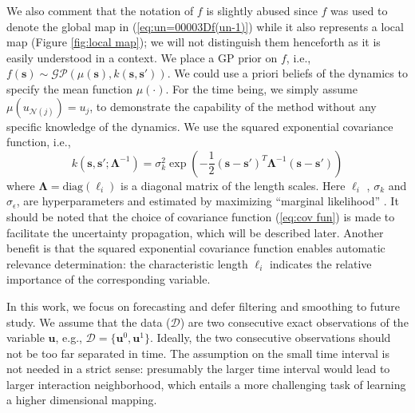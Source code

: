 \documentclass[smallextended,natbib]{svjour3}       %
\begin{document}
We also comment that the notation of $f$ is slightly abused since $f$ was used to denote the global map in (\ref{eq:un=00003Df(un-1)}) while it also represents a local map (Figure \ref{fig:local map}); we will not distinguish them henceforth as it is easily understood in a context. We place a GP prior on $f$, i.e., $f(\mathbf{s})\sim\mathcal{GP}(\mu(\mathbf{s}),k(\mathbf{s},\mathbf{s}'))$. We could use a priori beliefs of the dynamics to specify the mean function $\mu(\cdot)$. For the time being, we simply assume $\mu(u_{\mathcal{N}(j)})=u_{j}$, to demonstrate the capability of the method without any specific knowledge of the dynamics. We use the squared exponential covariance function, i.e., 
\begin{equation}
k(\mathbf{s},\mathbf{s}';\boldsymbol{\Lambda}^{-1})=\sigma_{k}^{2}\exp(-\frac{1}{2}(\mathbf{s-s}')^{T}\boldsymbol{\Lambda}^{-1}(\mathbf{s-s}')) \label{eq:cov fun}
\end{equation}
 where $\boldsymbol{\Lambda}=\text{diag}(\ell_{i})$ is a diagonal matrix of the length scales. Here $\ell_{i}$ , $\sigma_{k}$ and  $\sigma_{\epsilon}$, are hyperparameters and estimated by maximizing ``marginal likelihood'' \citep{Rasmussen2006}. It should be noted that the choice of covariance function (\ref{eq:cov fun}) is made to facilitate the uncertainty propagation, which will be described later. Another benefit is that the squared exponential covariance function enables automatic relevance determination: the characteristic length $\ell_{i}$ indicates the relative importance of the corresponding variable. 
 
In this work, we focus on forecasting and defer filtering and smoothing to future study. We assume that the data ($\mathcal{D}$) are two consecutive exact observations of the variable $\mathbf{u}$, e.g., $\mathcal{D}=\{\mathbf{u}^{0},\mathbf{u}^{1}\}$.  Ideally, the two consecutive observations should not be too far separated in time.  The assumption on the small time interval is not needed in a strict sense: presumably the larger time interval would lead to larger interaction neighborhood, which entails a more challenging task of learning a higher dimensional mapping. 
\end{document}
